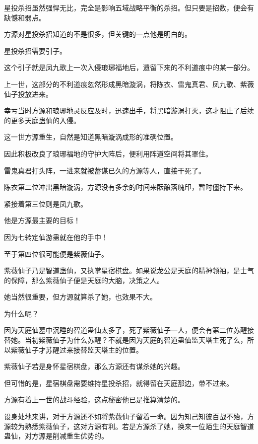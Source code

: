 
\begin{this_body}

星投杀招虽然强悍无比，完全是影响五域战略平衡的杀招。但只要是招数，便会有缺憾和弱点。

方源对星投杀招知道的不是很多，但关键的一点他是明白的。

星投杀招需要引子。

这个引子就是凤九歌上一次入侵琅琊福地后，遗留下来的不利道痕中的某一部分。

上一世，这部分的不利道痕忽然形成黑暗漩涡，将陈衣、雷鬼真君、凤九歌、紫薇仙子投放进来。

幸亏当时方源和琅琊地灵反应及时，迅速出手，将黑暗漩涡打灭，这才阻止了后续的更多天庭蛊仙的入侵。

这一世方源重生，自然是知道黑暗漩涡成形的准确位置。

因此积极改良了琅琊福地的守护大阵后，便利用阵道空间将其罩住。

雷鬼真君打头阵，一进来就被蓄谋已久的方源等人，直接干死了。

陈衣第二位冲出黑暗漩涡，方源没有多余的时间来酝酿落魄印，暂时僵持下来。

紧接着第三位则是凤九歌。

他是方源最主要的目标！

因为七转定仙游蛊就在他的手中！

至于第四位很可能便是紫薇仙子。

紫薇仙子乃是智道蛊仙，又执掌星宿棋盘。如果说龙公是天庭的精神领袖，是士气的保障，那么紫薇仙子便是天庭的大脑，决策之人。

她当然很重要，但方源就算杀了她，也效果不大。

为什么呢？

因为天庭仙墓中沉睡的智道蛊仙太多了，死了紫薇仙子一人，便会有第二位苏醒接替她。当初紫薇仙子为什么苏醒？不就是因为天庭的智道蛊仙监天塔主死了么，所以紫薇仙子才苏醒过来接替监天塔主的位置。

紫薇仙子若是身怀星宿棋盘，那么方源还有谋杀她的兴趣。

但可惜的是，星宿棋盘需要维持星投杀招，就得留在天庭那边，带不过来。

方源有着上一世的战斗经验，这点秘密他已是推算清楚的。

设身处地来讲，对于方源还不如将紫薇仙子留着一命。因为知己知彼百战不殆，方源较为熟悉紫薇仙子，这对方源有利。若是方源杀了她，换来一位陌生的天庭智道蛊仙，对方源是削减重生优势的。


\end{this_body}
